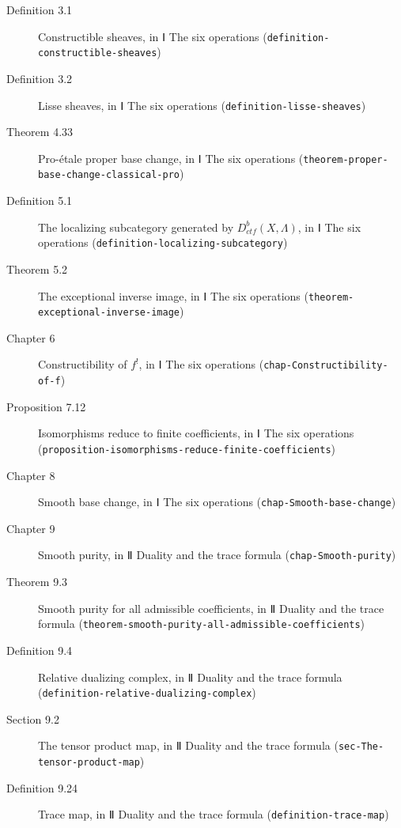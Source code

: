 \documentclass[11pt]{article}
\newcommand{\bpslug}[1]{\texttt{#1}}
\providecommand{\Dctf}{}\renewcommand{\Dctf}{D^b_{ctf}}
\begin{document}
\begin{description}
\item[Definition 3.1] Constructible sheaves, in Ⅰ The six operations (\bpslug{definition-{}\allowbreak{}constructible-{}\allowbreak{}sheaves})
\item[Definition 3.2] Lisse sheaves, in Ⅰ The six operations (\bpslug{definition-{}\allowbreak{}lisse-{}\allowbreak{}sheaves})
\item[Theorem 4.33] Pro-étale proper base change, in Ⅰ The six operations (\bpslug{theorem-{}\allowbreak{}proper-{}\allowbreak{}base-{}\allowbreak{}change-{}\allowbreak{}classical-{}\allowbreak{}pro})
\item[Definition 5.1] The localizing subcategory generated by $\Dctf(X,\Lambda)$, in Ⅰ The six operations (\bpslug{definition-{}\allowbreak{}localizing-{}\allowbreak{}subcategory})
\item[Theorem 5.2] The exceptional inverse image, in Ⅰ The six operations (\bpslug{theorem-{}\allowbreak{}exceptional-{}\allowbreak{}inverse-{}\allowbreak{}image})
\item[Chapter 6] Constructibility of $f^!$, in Ⅰ The six operations (\bpslug{chap-{}\allowbreak{}Constructibility-{}\allowbreak{}of-{}\allowbreak{}f})
\item[Proposition 7.12] Isomorphisms reduce to finite coefficients, in Ⅰ The six operations (\bpslug{proposition-{}\allowbreak{}isomorphisms-{}\allowbreak{}reduce-{}\allowbreak{}finite-{}\allowbreak{}coefficients})
\item[Chapter 8] Smooth base change, in Ⅰ The six operations (\bpslug{chap-{}\allowbreak{}Smooth-{}\allowbreak{}base-{}\allowbreak{}change})
\item[Chapter 9] Smooth purity, in Ⅱ Duality and the trace formula (\bpslug{chap-{}\allowbreak{}Smooth-{}\allowbreak{}purity})
\item[Theorem 9.3] Smooth purity for all admissible coefficients, in Ⅱ Duality and the trace formula (\bpslug{theorem-{}\allowbreak{}smooth-{}\allowbreak{}purity-{}\allowbreak{}all-{}\allowbreak{}admissible-{}\allowbreak{}coefficients})
\item[Definition 9.4] Relative dualizing complex, in Ⅱ Duality and the trace formula (\bpslug{definition-{}\allowbreak{}relative-{}\allowbreak{}dualizing-{}\allowbreak{}complex})
\item[Section 9.2] The tensor product map, in Ⅱ Duality and the trace formula (\bpslug{sec-{}\allowbreak{}The-{}\allowbreak{}tensor-{}\allowbreak{}product-{}\allowbreak{}map})
\item[Definition 9.24] Trace map, in Ⅱ Duality and the trace formula (\bpslug{definition-{}\allowbreak{}trace-{}\allowbreak{}map})

\end{description}
\end{document}
